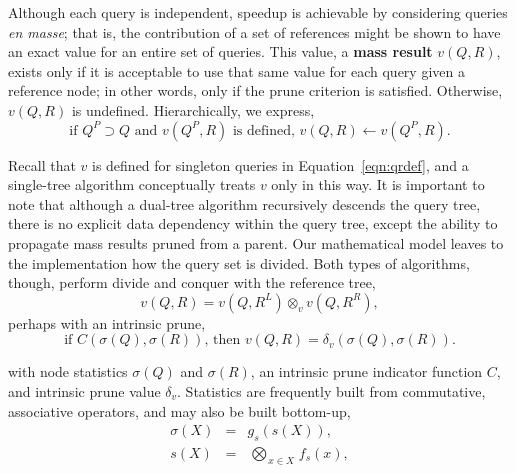 \documentclass[twoside,leqno,twocolumn]{article}
\newcommand{\summary}{\delta}
\newcommand{\defterm}[1]{{\bf #1}}
\newcommand{\kdleft}[1]{#1^{\!L}}
\newcommand{\kdright}[1]{#1^{\!R}}
\newcommand{\kdparent}[1]{#1^{\!P}}
\newcommand{\nameOp}[2]{\mathop{#1\nolimits\!\!_{#2}}}
\newcommand{\nameop}[2]{#1_{\!#2}}
\newcommand{\myOp}[1]{\nameOp{\bigotimes}{#1}}
\newcommand{\myop}[1]{\nameop{\otimes}{#1}}
\newcommand{\letterqr}{v}
\newcommand{\opqr}{\myop{\letterqr}}
\newcommand{\letterqrv}{v}
\newcommand{\inqrv}{v}
\newcommand{\deltaqrv}{\summary_{\letterqrv}}
\newcommand{\canpruneqrv}{C}%
\newcommand{\letterstat}{s}
\newcommand{\outstat}{\sigma}
\newcommand{\instat}{s}
\newcommand{\Opstat}{\myOp{\letterstat}}
\newcommand{\fstat}{f_{\letterstat}}
\newcommand{\gstat}{g_{\letterstat}}
\begin{document}
Although each query is independent, speedup is achievable by considering queries {\it en masse}; that is, the contribution of a set of references might be shown to have an exact value for an entire set of queries.
This value, a \defterm{mass result} $\inqrv(Q, R)$, exists only if it is acceptable to use that same value for each query given a reference node; in other words, only if the prune criterion is satisfied.
Otherwise, $\inqrv(Q,R)$ is undefined.
Hierarchically, we express,
\begin{equation}
\text{if } \kdparent{Q} \supset Q \text{ and }\inqrv(\kdparent{Q}, R)\text{ is defined, } \inqrv(Q, R) \gets \inqrv(\kdparent{Q}, R).
\label{eqn:qrvparent}
\end{equation}

\noindent
Recall that $\inqrv$ is defined for singleton queries in Equation~\ref{eqn:qrdef}, and a single-tree algorithm conceptually treats $\inqrv$ only in this way.
It is important to note that although a dual-tree algorithm recursively descends the query tree, there is no explicit data dependency within the query tree, except the ability to propagate mass results pruned from a parent.
Our mathematical model leaves to the implementation how the query set is divided.
Both types of algorithms, though, perform divide and conquer with the reference tree,
\begin{equation}
\inqrv(Q, R) = \inqrv(Q, \kdleft{R}) \opqr \inqrv(Q, \kdright{R}),
\label{eqn:qrvcompose}
\end{equation}
\noindent perhaps with an intrinsic prune,
\begin{equation}
\text{if } \canpruneqrv(\outstat(Q), \outstat(R)) \text{, then } \inqrv(Q, R) = \deltaqrv(\outstat(Q), \outstat(R)).
\label{eqn:qrvprune}
\end{equation}

\noindent
with node statistics $\outstat(Q)$ and $\outstat(R)$, an intrinsic prune indicator function $\canpruneqrv$, and intrinsic prune value $\deltaqrv$.
Statistics are frequently built from commutative, associative operators, and may also be built bottom-up,
\begin{eqnarray}
\outstat(X) &=& \gstat(\instat(X)),
\\
\instat(X) &=& \Opstat_{x \in X} \fstat(x),
\label{eqn:defstat}
\end{eqnarray}
\end{document}
